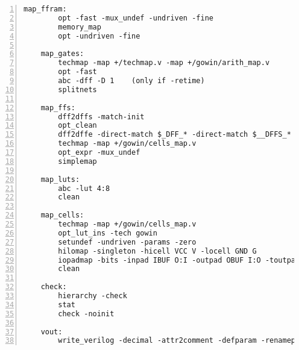 \begin{lstlisting}[numbers=left,frame=single]
    map_ffram:
        opt -fast -mux_undef -undriven -fine
        memory_map
        opt -undriven -fine

    map_gates:
        techmap -map +/techmap.v -map +/gowin/arith_map.v
        opt -fast
        abc -dff -D 1    (only if -retime)
        splitnets

    map_ffs:
        dff2dffs -match-init
        opt_clean
        dff2dffe -direct-match $_DFF_* -direct-match $__DFFS_*
        techmap -map +/gowin/cells_map.v
        opt_expr -mux_undef
        simplemap

    map_luts:
        abc -lut 4:8
        clean

    map_cells:
        techmap -map +/gowin/cells_map.v
        opt_lut_ins -tech gowin
        setundef -undriven -params -zero
        hilomap -singleton -hicell VCC V -locell GND G
        iopadmap -bits -inpad IBUF O:I -outpad OBUF I:O -toutpad TBUF OEN:I:O -tinoutpad IOBUF OEN:O:I:IO    (unless -noiopads)
        clean

    check:
        hierarchy -check
        stat
        check -noinit

    vout:
        write_verilog -decimal -attr2comment -defparam -renameprefix gen <file-name>
\end{lstlisting}

